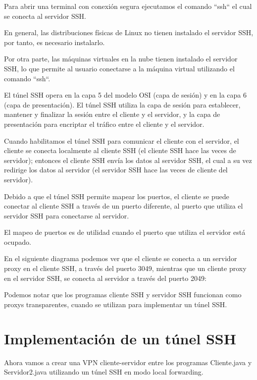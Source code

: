 \documentclass[11pt,a4paper,oneside]{book}
\begin{document}
Para abrir una terminal con conexión segura ejecutamos el comando ``ssh`` el cual se conecta al servidor SSH.

En general, las distribuciones físicas de Linux no tienen instalado el servidor SSH, por tanto, es necesario instalarlo.

Por otra parte, las máquinas virtuales en la nube tienen instalado el servidor SSH, lo que permite al usuario conectarse a la máquina virtual utilizando el comando ``ssh``.

El túnel SSH opera en la capa 5 del modelo OSI (capa de sesión) y en la capa 6 (capa de presentación). El túnel SSH utiliza la capa de sesión para establecer, mantener y finalizar la sesión entre el cliente y el servidor, y la capa de presentación para encriptar el tráfico entre el cliente y el servidor.

Cuando habilitamos el túnel SSH para comunicar el cliente con el servidor, el cliente se conecta localmente al cliente SSH (el cliente SSH hace las veces de servidor); entonces el cliente SSH envía los datos al servidor SSH, el cual a su vez redirige los datos al servidor (el servidor SSH hace las veces de cliente del servidor).

Debido a que el túnel SSH permite mapear los puertos, el cliente se puede conectar al cliente SSH a través de un puerto diferente, al puerto que utiliza el servidor SSH para conectarse al servidor.

El mapeo de puertos es de utilidad cuando el puerto que utiliza el servidor está ocupado.

En el siguiente diagrama podemos ver que el cliente se conecta a un servidor proxy en el cliente SSH, a través del puerto 3049, mientras que un cliente proxy en el servidor SSH, se conecta al servidor a través del puerto 2049:

Podemos notar que los programas cliente SSH y servidor SSH funcionan como proxys transparentes, cuando se utilizan para implementar un túnel SSH.

\section{Implementación de un túnel SSH}

Ahora vamos a crear una VPN cliente-servidor entre los programas Cliente.java y Servidor2.java utilizando un túnel SSH en modo local forwarding.
\end{document}
